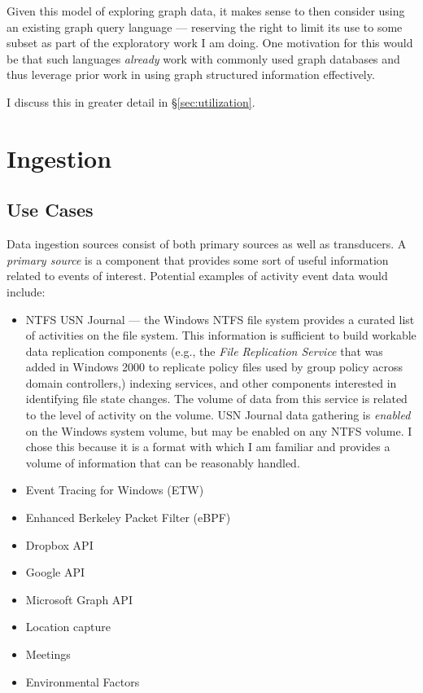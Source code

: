 \documentclass[sigconf,anonymous,review]{acmart}
\begin{document}
Given this model of exploring graph data, it makes sense to then consider using
an existing graph query language --- reserving the right to limit its use to
some subset as part of the exploratory work I am doing.  One motivation for this
would be that such languages \emph{already} work with commonly used graph
databases and thus leverage prior work in using graph structured information
effectively.

I discuss this in greater detail in \S \ref{sec:utilization}.

\section{Ingestion}
\label{sec:ingestion}

\subsection{Use Cases}

Data ingestion sources consist of both primary sources as well as transducers.
A \emph{primary source} is a component that provides some sort of useful
information related to events of interest.  Potential examples of activity event
data would include:

\begin{itemize}
    \item NTFS USN Journal --- the Windows NTFS file system provides a curated
    list of activities on the file system.  This information is sufficient to
    build workable data replication components (e.g., the \emph{File Replication
    Service} that was added in Windows 2000 to replicate policy files used by
    group policy across domain controllers,) indexing services, and other
    components interested in identifying file state changes.  The volume of data
    from this service is related to the level of activity on the volume.  USN
    Journal data gathering is \emph{enabled} on the Windows system volume, but
    may be enabled on any NTFS volume. I chose this because it is a format with
    which I am familiar and provides a volume of information that can be
    reasonably handled.

    \item Event Tracing for Windows (ETW)
    \item Enhanced Berkeley Packet Filter (eBPF)
    \item Dropbox API
    \item Google API
    \item Microsoft Graph API
    \item Location capture
    \item Meetings
    \item Environmental Factors
\end{itemize}
\end{document}
